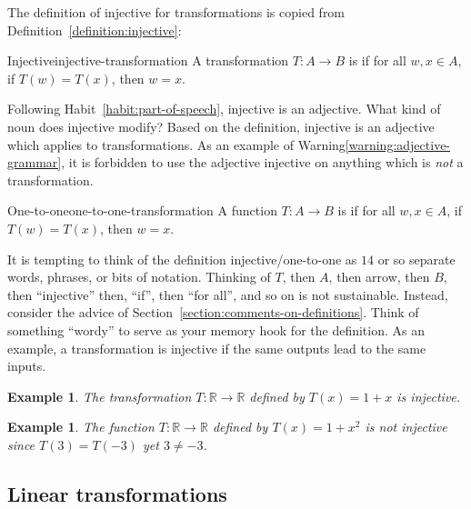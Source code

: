 \documentclass{book}
\newcounter{ekcounter}%
\theoremstyle{ekimcustom}
\newtheorem{example}[ekcounter]{Example}
\newcommand\defn[1]{{\color{blue}{\bf #1}}}
\begin{document}
The definition of injective for transformations is copied from Definition~\ref{definition:injective}:
\begin{bdefinition}{Injective}{injective-transformation}
A transformation $T : A \to B$ is \defn{injective} if for all $w, x \in A$, if $T(w)=T(x)$, then $w=x$.
\end{bdefinition}
Following Habit~\ref{habit:part-of-speech}, injective is an adjective. What kind of noun does injective modify? Based on the definition, injective is an adjective which applies to transformations. As an example of Warning\ref{warning:adjective-grammar}, it is forbidden to use the adjective injective on anything which is \emph{not} a transformation.

\begin{bdefinition}{One-to-one}{one-to-one-transformation}
A function $T : A \to B$ is \defn{one-to-one} if for all $w, x \in A$, if $T(w)=T(x)$, then $w=x$.
\end{bdefinition}

\begin{bhabit}{}{}
It is tempting to think of the definition injective/one-to-one as $14$ or so separate words, phrases, or bits of notation. Thinking of $T$, then $A$, then arrow, then $B$, then ``injective'' then, ``if'', then ``for all'', and so on is not sustainable. Instead, consider the advice of Section~\ref{section:comments-on-definitions}. Think of something ``wordy'' to serve as your memory hook for the definition. As an example, a transformation is injective if the same outputs lead to the same inputs.
\end{bhabit}

\begin{example}
The transformation $T : \mathbb{R} \to \mathbb{R}$ defined by $T(x) = 1 + x$ is injective.
\end{example}
\begin{example}
The function $T : \mathbb{R} \to \mathbb{R}$ defined by $T(x) = 1 + x^2$ is not injective since $T(3)=T(-3)$ yet $3 \not= -3$.
\end{example}

\subsection{Linear transformations}
\end{document}

